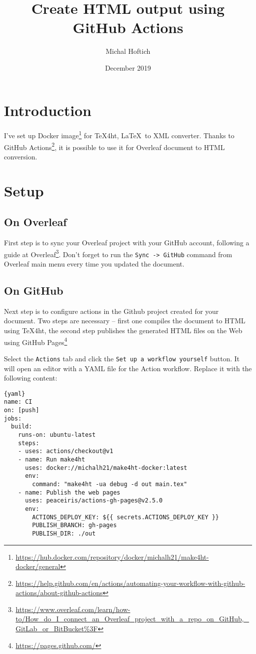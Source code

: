 \documentclass{article}
\title{Create HTML output using GitHub Actions}
\author{Michal Hoftich}
\date{December 2019}
\newcommand{\cmdname}[1]{\texttt{#1}}
\newcommand\footurl[1]{\footnote{\url{#1}}}
\begin{document}
\maketitle

\section{Introduction}

I've set up Docker image\footurl{https://hub.docker.com/repository/docker/michalh21/make4ht-docker/general} for \TeX4ht, \LaTeX\ to XML converter. Thanks to GitHub 
Actions\footurl{https://help.github.com/en/actions/automating-your-workflow-with-github-actions/about-github-actions}, it is possible to use it for Overleaf document to HTML conversion.

\section{Setup}

\subsection{On Overleaf}

First step is to sync your Overleaf project with your GitHub account, following a guide at Overleaf\footurl{https://www.overleaf.com/learn/how-to/How_do_I_connect_an_Overleaf_project_with_a_repo_on_GitHub,_GitLab_or_BitBucket\%3F}. Don't forget to run the \cmdname{Sync -> GitHub} command from Overleaf main menu every time you updated the document.

\subsection{On GitHub}
Next step is to configure actions in the Github project created for your document. Two steps are necessary -- first  one compiles the document to HTML using \TeX4ht, the second step publishes the generated HTML files on the Web using GitHub Pages\footurl{https://pages.github.com/}

Select the \cmdname{Actions} tab and click the \cmdname{Set up a workflow yourself} button. It will open an editor with a YAML file for the Action workflow. Replace it with the following content:

\begin{lstlisting}{yaml}
name: CI
on: [push]
jobs:
  build:
    runs-on: ubuntu-latest
    steps:
    - uses: actions/checkout@v1
    - name: Run make4ht
      uses: docker://michalh21/make4ht-docker:latest
      env:
        command: "make4ht -ua debug -d out main.tex"
    - name: Publish the web pages
      uses: peaceiris/actions-gh-pages@v2.5.0
      env:
        ACTIONS_DEPLOY_KEY: ${{ secrets.ACTIONS_DEPLOY_KEY }}
        PUBLISH_BRANCH: gh-pages
        PUBLISH_DIR: ./out    
\end{lstlisting}
\end{document}
